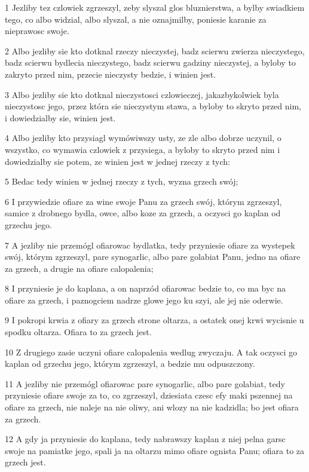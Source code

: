 \par 1 Jezliby tez czlowiek zgrzeszyl, zeby slyszal glos bluznierstwa, a bylby swiadkiem tego, co albo widzial, albo slyszal, a nie oznajmilby, poniesie karanie za nieprawosc swoje.
\par 2 Albo jezliby sie kto dotknal rzeczy nieczystej, badz scierwu zwierza nieczystego, badz scierwu bydlecia nieczystego, badz scierwu gadziny nieczystej, a byloby to zakryto przed nim, przecie nieczysty bedzie, i winien jest.
\par 3 Albo jezliby sie kto dotknal nieczystosci czlowieczej, jakazbykolwiek byla nieczystosc jego, przez która sie nieczystym stawa, a byloby to skryto przed nim, i dowiedzialby sie, winien jest.
\par 4 Albo jezliby kto przysiagl wymówiwszy usty, ze zle albo dobrze uczynil, o wszystko, co wymawia czlowiek z przysiega, a byloby to skryto przed nim i dowiedzialby sie potem, ze winien jest w jednej rzeczy z tych:
\par 5 Bedac tedy winien w jednej rzeczy z tych, wyzna grzech swój;
\par 6 I przywiedzie ofiare za wine swoje Panu za grzech swój, którym zgrzeszyl, samice z drobnego bydla, owce, albo koze za grzech, a oczysci go kaplan od grzechu jego.
\par 7 A jezliby nie przemógl ofiarowac bydlatka, tedy przyniesie ofiare za wystepek swój, którym zgrzeszyl, pare synogarlic, albo pare golabiat Panu, jedno na ofiare za grzech, a drugie na ofiare calopalenia;
\par 8 I przyniesie je do kaplana, a on naprzód ofiarowac bedzie to, co ma byc na ofiare za grzech, i paznogciem nadrze glowe jego ku szyi, ale jej nie oderwie.
\par 9 I pokropi krwia z ofiary za grzech strone oltarza, a ostatek onej krwi wycisnie u spodku oltarza. Ofiara to za grzech jest.
\par 10 Z drugiego zasie uczyni ofiare calopalenia wedlug zwyczaju. A tak oczysci go kaplan od grzechu jego, którym zgrzeszyl, a bedzie mu odpuszczony.
\par 11 A jezliby nie przemógl ofiarowac pare synogarlic, albo pare golabiat, tedy przyniesie ofiare swoje za to, co zgrzeszyl, dziesiata czesc efy maki pszennej na ofiare za grzech, nie naleje na nie oliwy, ani wlozy na nie kadzidla; bo jest ofiara za grzech.
\par 12 A gdy ja przyniesie do kaplana, tedy nabrawszy kaplan z niej pelna garsc swoje na pamiatke jego, spali ja na oltarzu mimo ofiare ognista Panu; ofiara to za grzech jest.
